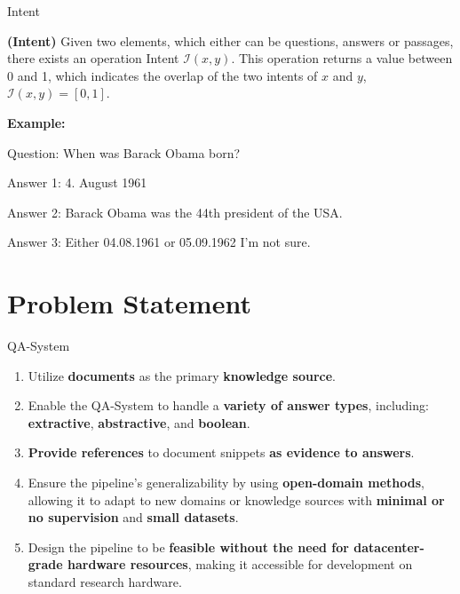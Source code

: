 \documentclass{beamer}
\begin{document}
\begin{frame}{Intent}
  
  \begin{definition}
    \textbf{(Intent)} Given two elements, which either can be questions, answers or passages, there exists an operation Intent $\mathcal{I}(x, y)$. This operation returns a value between 0 and 1, which indicates the overlap of the two intents of $x$ and $y$, $\mathcal{I}(x, y) = [0,1]$.
    \label{def:intent}
  \end{definition}

  \bigskip
  \textbf{Example:}
  \begin{flushleft}
    Question: When was Barack Obama born?
  \end{flushleft}
  \begin{flushleft}
    Answer 1: 4. August 1961

    Answer 2: Barack Obama was the 44th president of the USA.
    
    Answer 3: Either 04.08.1961 or 05.09.1962 I'm not sure. 
  \end{flushleft}

\end{frame}

\section[Problem Statement]{Problem Statement}

\begin{frame}{QA-System}
  \begin{enumerate}
    \item Utilize \textbf{documents} as the primary \textbf{knowledge source}.
    \item Enable the QA-System to handle a \textbf{variety of answer types}, including: \textbf{extractive}, \textbf{abstractive}, and \textbf{boolean}.
    \item \textbf{Provide references} to document snippets \textbf{as evidence to answers}.
    \item Ensure the pipeline's generalizability by using \textbf{open-domain methods}, allowing it to adapt to new domains or knowledge sources with \textbf{minimal or no supervision} and \textbf{small datasets}.
    \item Design the pipeline to be \textbf{feasible without the need for datacenter-grade hardware resources}, making it accessible for development on standard research hardware.
  \end{enumerate}
\end{frame}
  
\end{document}
